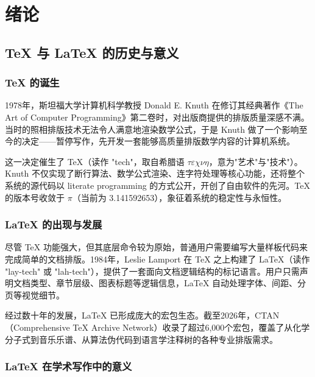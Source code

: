 \documentclass[../main-manual.tex]{subfiles}
\begin{document}
\cleardoublepage
\thispagestyle{empty}
 \songti
\setlength{\baselineskip}{24pt}
\RaggedRight
\setlength{\parindent}{2em}
\raggedbottom

\chapter{绪论} \label{ch:intro}

\section{\TeX{} 与 \LaTeX{} 的历史与意义}

\subsection{\TeX{} 的诞生}

1978年，斯坦福大学计算机科学教授 Donald E. Knuth 在修订其经典著作《The Art of Computer Programming》第二卷时，对出版商提供的排版质量深感不满。当时的照相排版技术无法令人满意地渲染数学公式，于是 Knuth 做了一个影响至今的决定——暂停写作，先开发一套能够高质量排版数学内容的计算机系统。

这一决定催生了 \TeX{}（读作 "tech"，取自希腊语 $\tau\varepsilon\chi\nu\eta$，意为"艺术"与"技术"）。Knuth 不仅实现了断行算法、数学公式渲染、连字符处理等核心功能，还将整个系统的源代码以 literate programming 的方式公开\cite{Knuth1984}，开创了自由软件的先河。\TeX{} 的版本号收敛于 $\pi$（当前为 3.141592653），象征着系统的稳定性与永恒性。

\subsection{\LaTeX{} 的出现与发展}

尽管 \TeX{} 功能强大，但其底层命令较为原始，普通用户需要编写大量样板代码来完成简单的文档排版。1984年，Leslie Lamport 在 \TeX{} 之上构建了 \LaTeX{}（读作 "lay-tech" 或 "lah-tech"）\cite{Lamport1994}，提供了一套面向文档逻辑结构的标记语言。用户只需声明文档类型、章节层级、图表标题等逻辑信息，\LaTeX{} 自动处理字体、间距、分页等视觉细节。

经过数十年的发展，\LaTeX{} 已形成庞大的宏包生态。截至2026年，CTAN（Comprehensive \TeX{} Archive Network）收录了超过6,000个宏包，覆盖了从化学分子式到音乐乐谱、从算法伪代码到语言学注释树的各种专业排版需求。

\subsection{\LaTeX{} 在学术写作中的意义}
\end{document}
